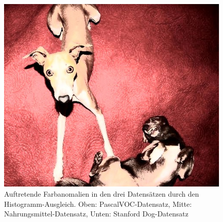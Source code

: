 \begin{appendices}
\begin{figure}[htb]
\begin{minipage}{0.19\textwidth}
\includegraphics[width=\textwidth]{images/anomalien/HA/n02091032_12113.jpg}
\end{minipage}
\caption{Auftretende Farbanomalien in den drei Datensätzen durch den Histogramm-Ausgleich. Oben: PascalVOC-Datensatz, Mitte: Nahrungsmittel-Datensatz, Unten: Stanford Dog-Datensatz}
\label{img:anoHA}
\end{figure}


\end{appendices}
